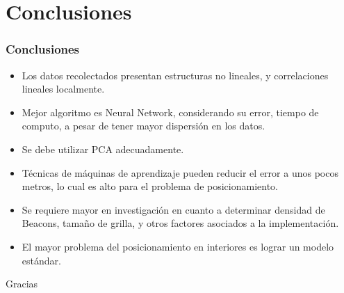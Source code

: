 \documentclass[handout]{beamer}
\begin{document}
\section{Conclusiones}

\begin{frame}
\frametitle{Conclusiones}

\begin{itemize}

\item Los datos recolectados presentan estructuras no lineales, y correlaciones lineales localmente.
\pause

\item Mejor algoritmo es Neural Network, considerando su error, tiempo de computo, a pesar de tener mayor dispersión en los datos.

\pause

\item Se debe utilizar PCA adecuadamente.

\pause

\item Técnicas de máquinas de aprendizaje pueden reducir el error a unos pocos metros, lo cual es alto para el problema de posicionamiento.
\pause

\item Se requiere mayor en investigación en cuanto a determinar densidad de Beacons, tamaño de grilla, y otros factores asociados a la implementación.
\pause

\item El mayor problema del posicionamiento en interiores es lograr un modelo estándar.

\end{itemize}

\end{frame}

\begin{frame}
\Huge{\centerline{Gracias}}
\end{frame}

\end{document}
